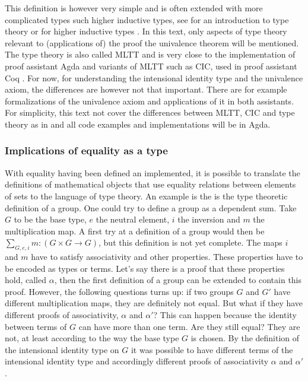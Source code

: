 \documentclass[12pt,a4paper,twoside,xetex]{book} %
\begin{document}
This definition is however very simple and is often extended with more complicated types such higher inductive types, see for an introduction to type theory
\cite{Palmgren2014} or for higher inductive types \cite{Voevodsky2013}. In this text, only aspects of type 
theory relevant to (applications of) the proof the univalence theorem will be 
mentioned. The type theory  is also called MLTT and is very close to the implementation of proof assistant Agda \cite{Abel2019} and variants of MLTT such as CIC, used in proof assistant Coq \cite{Arias2019}. For now, for understanding the intensional 
identity type and the univalence axiom, the differences are however not that 
important. There are for example formalizations of the univalence axiom and 
applications of it in both assistants. For simplicity, this text not cover the differences between MLTT,  CIC and type theory as in  and all code examples and implementations will be in Agda.

\subsubsection{Implications of equality as a type}\label{groupex}

With equality having been defined an implemented, it is possible to translate 
the definitions of mathematical objects that use equality relations between 
elements of sets to the language of type theory. An example is the is the type 
theoretic definition of a group. One could try to define a group as a dependent 
sum. Take $G$ to be the base type, $e$ the neutral element, $i$ the inversion 
and $m$ the multiplication map. A first try at a definition of a group would 
then be $\sum_{G,e,i}m:(G\times G \rightarrow G)$, but this definition is not 
yet complete. The maps $i$ and $m$  have to satisfy associativity and other 
properties. These properties have to be encoded as types or terms. Let's say there is a proof that these properties hold, called $\alpha$, then the first definition of a group can be extended to contain this proof. However, the following questions turns up: if two groups $G$ and $G'$ have different multiplication 
maps, they are definitely not equal. But what if they have different proofs of 
associativity, $\alpha$ and $\alpha'$? This can happen because the identity 
between terms of  $G$ can have more than one term. Are they still equal? They 
are not, at least according to the way the base type $G$ is chosen. By the 
definition of the intensional identity type on $G$ it was possible to have 
different terms of the intensional identity type and accordingly different 
proofs of associativity $\alpha$ and $\alpha'$.
\end{document}

